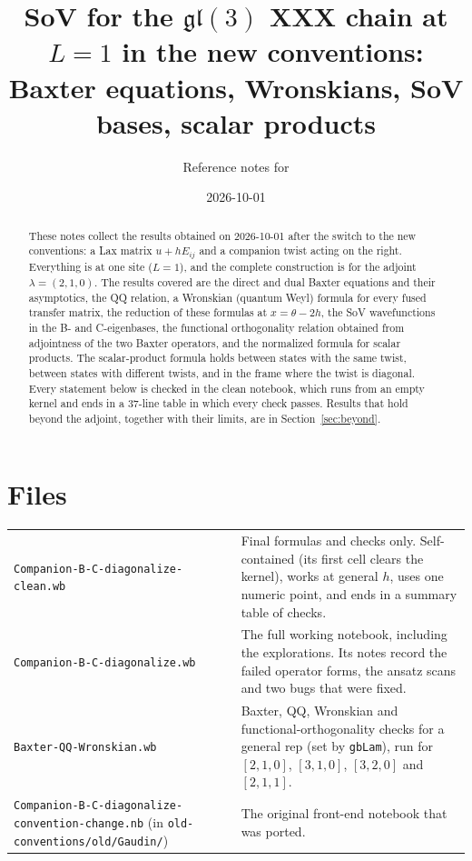 \documentclass[11pt]{article}
\title{SoV for the $\mathfrak{gl}(3)$ XXX chain at $L=1$ in the new conventions:\\
Baxter equations, Wronskians, SoV bases, scalar products}
\author{Reference notes for \nb{new-conventions/Companion-B-C-diagonalize-clean.wb}}
\date{2026-10-01}
\newcommand{\nb}[1]{\texttt{#1}}
\begin{document}
\maketitle

\begin{abstract}
These notes collect the results obtained on 2026-10-01 after the switch to the new conventions: a Lax matrix $u+hE_{ij}$ and a companion twist acting on the right. Everything is at one site ($L=1$), and the complete construction is for the adjoint $\lambda=(2,1,0)$. The results covered are the direct and dual Baxter equations and their asymptotics, the QQ relation, a Wronskian (quantum Weyl) formula for every fused transfer matrix, the reduction of these formulas at $x=\theta-2h$, the SoV wavefunctions in the B- and C-eigenbases, the functional orthogonality relation obtained from adjointness of the two Baxter operators, and the normalized formula for scalar products. The scalar-product formula holds between states with the same twist, between states with different twists, and in the frame where the twist is diagonal. Every statement below is checked in the clean notebook, which runs from an empty kernel and ends in a 37-line table in which every check passes. Results that hold beyond the adjoint, together with their limits, are in Section~\ref{sec:beyond}.
\end{abstract}

\tableofcontents

\section{Files}

\begin{center}
\begin{tabular}{p{6.6cm}p{8.4cm}}
\toprule
\nb{Companion-B-C-diagonalize-clean.wb} & Final formulas and checks only. Self-contained (its first cell clears the kernel), works at general $h$, uses one numeric point, and ends in a summary table of checks.\\
\nb{Companion-B-C-diagonalize.wb} & The full working notebook, including the explorations. Its notes record the failed operator forms, the ansatz scans and two bugs that were fixed.\\
\nb{Baxter-QQ-Wronskian.wb} & Baxter, QQ, Wronskian and functional-orthogonality checks for a general rep (set by \nb{gbLam}), run for $[2,1,0]$, $[3,1,0]$, $[3,2,0]$ and $[2,1,1]$.\\
\nb{Companion-B-C-diagonalize-convention-change.nb} (in \nb{old-conventions/old/Gaudin/}) & The original front-end notebook that was ported.\\
\bottomrule
\end{tabular}
\end{center}
\end{document}
